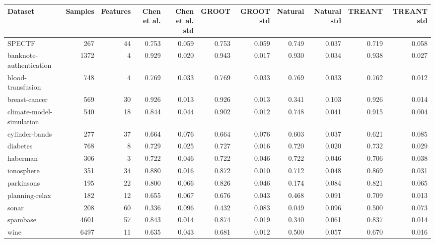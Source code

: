 \begin{tabular}{lrrrrrrrrrr}
\toprule
                  Dataset &  Samples &  Features &  Chen et al. &  Chen et al. std &  GROOT &  GROOT std &  Natural &  Natural std &  TREANT &  TREANT std \\
\midrule
                   SPECTF &      267 &        44 &        0.753 &            0.059 &  0.753 &      0.059 &    0.749 &        0.037 &   0.719 &       0.058 \\
  banknote-authentication &     1372 &         4 &        0.929 &            0.020 &  0.943 &      0.017 &    0.930 &        0.034 &   0.938 &       0.027 \\
        blood-transfusion &      748 &         4 &        0.769 &            0.033 &  0.769 &      0.033 &    0.769 &        0.033 &   0.762 &       0.012 \\
            breast-cancer &      569 &        30 &        0.926 &            0.013 &  0.926 &      0.013 &    0.341 &        0.103 &   0.926 &       0.014 \\
 climate-model-simulation &      540 &        18 &        0.844 &            0.044 &  0.902 &      0.012 &    0.748 &        0.041 &   0.915 &       0.004 \\
           cylinder-bands &      277 &        37 &        0.664 &            0.076 &  0.664 &      0.076 &    0.603 &        0.037 &   0.621 &       0.085 \\
                 diabetes &      768 &         8 &        0.729 &            0.025 &  0.727 &      0.016 &    0.720 &        0.020 &   0.732 &       0.029 \\
                 haberman &      306 &         3 &        0.722 &            0.046 &  0.722 &      0.046 &    0.722 &        0.046 &   0.706 &       0.038 \\
               ionosphere &      351 &        34 &        0.880 &            0.016 &  0.872 &      0.010 &    0.712 &        0.048 &   0.869 &       0.031 \\
               parkinsons &      195 &        22 &        0.800 &            0.066 &  0.826 &      0.046 &    0.174 &        0.084 &   0.821 &       0.065 \\
           planning-relax &      182 &        12 &        0.655 &            0.067 &  0.676 &      0.043 &    0.468 &        0.091 &   0.709 &       0.013 \\
                    sonar &      208 &        60 &        0.336 &            0.096 &  0.432 &      0.083 &    0.049 &        0.096 &   0.500 &       0.073 \\
                 spambase &     4601 &        57 &        0.843 &            0.014 &  0.874 &      0.019 &    0.340 &        0.061 &   0.837 &       0.014 \\
                     wine &     6497 &        11 &        0.635 &            0.043 &  0.681 &      0.012 &    0.500 &        0.057 &   0.670 &       0.016 \\
\bottomrule
\end{tabular}
